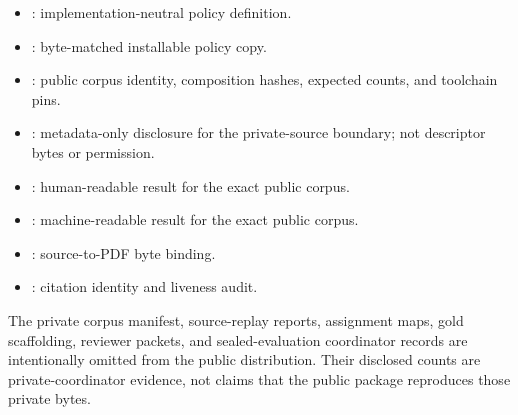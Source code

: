 \documentclass[11pt,letterpaper]{article}
\begin{document}
\begin{itemize}
    \item {}: implementation-neutral policy definition.
    \item {}: byte-matched installable policy copy.
    \item {}: public corpus identity, composition hashes, expected counts, and toolchain pins.
    \item {}: metadata-only disclosure for the private-source boundary; not descriptor bytes or permission.
    \item {}: human-readable result for the exact public corpus.
    \item {}: machine-readable result for the exact public corpus.
    \item {}: source-to-PDF byte binding.
    \item {}: citation identity and liveness audit.
\end{itemize}

The private corpus manifest, source-replay reports, assignment maps, gold scaffolding, reviewer packets, and sealed-evaluation coordinator records are intentionally omitted from the public distribution. Their disclosed counts are private-coordinator evidence, not claims that the public package reproduces those private bytes.
\end{document}
